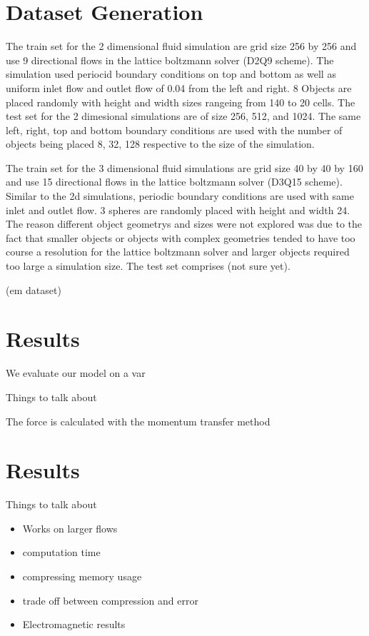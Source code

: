 \documentclass{article}
\begin{document}
\section{Dataset Generation}

The train set for the 2 dimensional fluid simulation are grid size 256 by 256 and use 9 directional flows in the lattice boltzmann solver (D2Q9 scheme). The simulation used periocid boundary conditions on top and bottom as well as uniform inlet flow and outlet flow of 0.04 from the left and right. 8 Objects are placed randomly with height and width sizes rangeing from 140 to 20 cells. The test set for the 2 dimesional simulations are of size 256, 512, and 1024. The same left, right, top and bottom boundary conditions are used with the number of objects being placed 8, 32, 128 respective to the size of the simulation. 

The train set for the 3 dimensional fluid simulations are grid size 40 by 40 by 160 and use 15 directional flows in the lattice boltzmann solver (D3Q15 scheme). Similar to the 2d simulations, periodic boundary conditions are used with same inlet and outlet flow. 3 spheres are randomly placed with height and width 24. The reason different object geometrys and sizes were not explored was due to the fact that smaller objects or objects with complex geometries tended to have too course a resolution for the lattice boltzmann solver and larger objects required too large a simulation size. The test set comprises (not sure yet).

(em dataset)

\section{Results}

We evaluate our model on a var

Things to talk about \cite{tompson2016accelerating}

The force is calculated with the momentum transfer method \cite{guo2013lattice}
\section{Results}

Things to talk about

\begin{itemize}
  \item Works on larger flows
  \item computation time
  \item compressing memory usage
  \item trade off between compression and error
  \item Electromagnetic results
\end{itemize}
\end{document}
